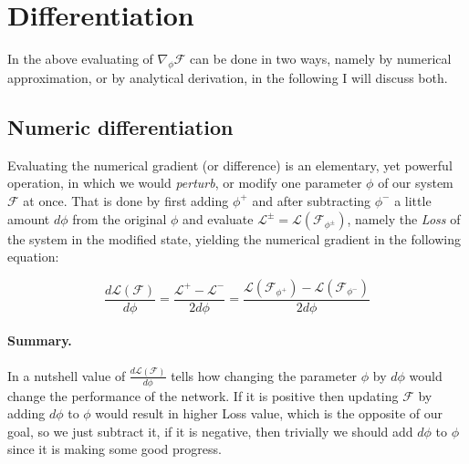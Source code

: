\section{Differentiation}\label{sec:diff}
In the above evaluating of $\nabla_\phi \mathcal{F}$ can be done in two ways, namely by numerical approximation, or by analytical derivation, in the following I will discuss both.

\subsection{Numeric differentiation} Evaluating the numerical gradient (or difference) is an elementary, yet powerful operation, in which we would \emph{perturb}, or modify one parameter $\phi$ of our system $\mathcal{F}$ at once.
That is done by first adding $\phi^+$ and after subtracting $\phi^-$ a little amount $d\phi$ from the original $\phi$ and evaluate $\mathcal{L}^{\pm}=\mathcal{L}(\mathcal{F}_{\phi^{\pm}})$, namely the \emph{Loss} of the system in the modified state, yielding the numerical gradient in the following equation:

\begin{equation} \label{eq:numgrad}
    \frac{d\mathcal{L}(\mathcal{F})}{d\phi} = 
    \frac{\mathcal{L}^+ - \mathcal{L}^-}{2 d\phi} = 
    \frac{\mathcal{L}(\mathcal{F}_{\phi^+}) - \mathcal{L}(\mathcal{F}_{\phi^-})}{2 d\phi}
\end{equation}

\paragraph{Summary.} In a nutshell value of $\frac{d\mathcal{L}(\mathcal{F})}{d\phi}$ tells how changing the parameter $\phi$ by $d\phi$ would change the performance of the network. If it is positive then updating $\mathcal{F}$ by adding $d\phi$ to $\phi$ would result in higher Loss value, which is the opposite of our goal, so we just subtract it, if it is negative, then trivially we should add $d\phi$ to $\phi$ since it is making some good progress.

